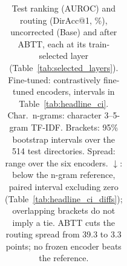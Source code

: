 \begin{table}[t]
\begin{tabular}{@{}lcccc@{}}
\bottomrule
\end{tabular}
\caption{Test ranking (AUROC) and routing (DirAcc@1, \%), uncorrected (Base) and after ABTT, each at its train-selected layer (Table~\ref{tab:selected_layers}). Fine-tuned: contrastively fine-tuned encoders, intervals in Table~\ref{tab:headline_ci}. Char.\ n-grams: character 3--5-gram TF-IDF. Brackets: 95\% bootstrap intervals over the 514 test directories. Spread: range over the six encoders. $\downarrow$: below the n-gram reference, paired interval excluding zero (Table~\ref{tab:headline_ci_diffs}); overlapping brackets do not imply a tie. ABTT cuts the routing spread from 39.3 to 3.3 points; no frozen encoder beats the reference.}
\label{tab:headline}
\end{table}
